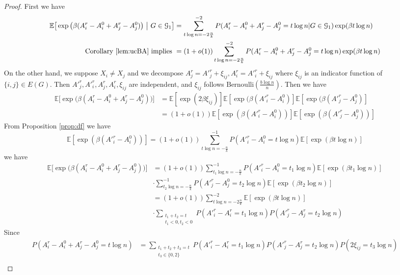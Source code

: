 \documentclass{article}
\begin{document}
\begin{proof}
First we have
\begin{align}
\mathbb{E} \big[  \exp\big(\beta (A^r_i - A^0_i + A^r_j - A^0_j) \big) ~\big|~ G\in\mathcal{G}_1 \big] 
&= \sum_{t \log n = -2\frac{n}{k} }^{-2} P(A^r_i - A^0_i + A^r_j - A^0_j = t\log n | G \in \mathcal{G}_1) \exp(\beta t \log n) \notag \\
\text{ Corollary \ref{lem:ucBA} implies } &= (1+o(1))
\sum_{t \log n = -2\frac{n}{k}}^{-2} P(A^r_i - A^0_i + A^r_j - A^0_j = t\log n) \exp(\beta t \log n)
\end{align}
On the other hand, we suppose $X_i \neq X_j$ and we decompose $A^r_j = A'^r_j + \xi_{ij}, A^r_i = A'^r_i + \xi_{ij}$ where $\xi_{ij}$ is an indicator function of $\{i,j\} \in E(G)$. Then $A'^r_j, A'^r_i, A^r_j, A^r_i, \xi_{ij}$ are independent, and
$\xi_{ij}$ follows $\textrm{Bernoulli}(\frac{b\log n}{n})$.
Then we have
\begin{align*}
\mathbb{E} \big[  \exp\big(\beta (A^r_i - A^0_i + A^r_j - A^0_j ) \big) \big] & = \mathbb{E}[\exp(2\beta \xi_{ij})] \mathbb{E}[\exp(\beta (A'^r_i - A^0_i)]
\mathbb{E}[\exp(\beta (A'^r_j - A^0_j)] \\
& = (1+o(1))\mathbb{E}[\exp(\beta(A'^r_i - A^0_i))] \mathbb{E}[\exp(\beta(A'^r_j - A^0_j))]
\end{align*}
From Proposition \ref{prop:df} we have
$$
\mathbb{E}[\exp(\beta(A'^r_i - A^0_i))] = (1+o(1)) \sum_{t \log n = -\frac{n}{k}}^{-1} P(A'^r_i - A^0_i = t \log n)\mathbb{E}[\exp(\beta t \log n)]
$$
we have
\begin{align*}
\mathbb{E} \big[  \exp\big(\beta (A^r_i - A^0_i + A^r_j - A^0_j ) \big) \big] & = (1+o(1))
\sum_{t_1 \log n =-\frac{n}{k} }^{-1} P(A'^r_i - A^0_i = t_1 \log n)\mathbb{E}[\exp(\beta t_1 \log n)] \\
& \cdot
\sum_{t_2 \log n=-\frac{n}{k}  }^{-1} P(A'^r_j - A^0_j = t_2 \log n)\mathbb{E}[\exp(\beta t_2 \log n)] \\
& = (1+o(1))  \sum_{t \log n = -2\frac{n}{k}  }^{-2} \mathbb{E}[\exp(\beta t \log n)]\\
& \cdot \sum_{\substack{t_1 + t_2 = t \\ t_1 < 0, t_2 < 0}}
P(A'^r_i - A^r_i = t_1 \log n) P(A'^r_j - A^r_j = t_2\log n)
\end{align*}
Since 
\begin{align*}
P(A^r_i - A^0_i + A^r_j - A^0_j = t\log n)
&= \sum_{\substack{t_1 + t_2 + t_3 = t\\ t_3 \in\{0, 2\}}} P(A'^r_i - A^r_i = t_1 \log n) P(A'^r_j - A^r_j = t_2 \log n) P(2\xi_{ij} = t_3 \log n) \\

\end{align*}
\end{proof}
\end{document}
